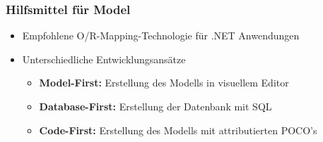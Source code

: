 \subsubsection{Hilfsmittel für Model}
\begin{itemize}[topsep=0pt, leftmargin=4mm]
    \setlength\itemsep{-0.3em}
    \item Empfohlene O/R-Mapping-Technologie für .NET Anwendungen
    \item Unterschiedliche Entwicklungsansätze
    \begin{itemize}[topsep=0pt, leftmargin=4mm]
        \setlength\itemsep{-0.3em}
        \item \textbf{Model-First:} Erstellung des Modells in visuellem Editor
        \item \textbf{Database-First:} Erstellung der Datenbank mit SQL
        \item \textbf{Code-First:} Erstellung des Modells mit attributierten POCO's
    \end{itemize}
\end{itemize}